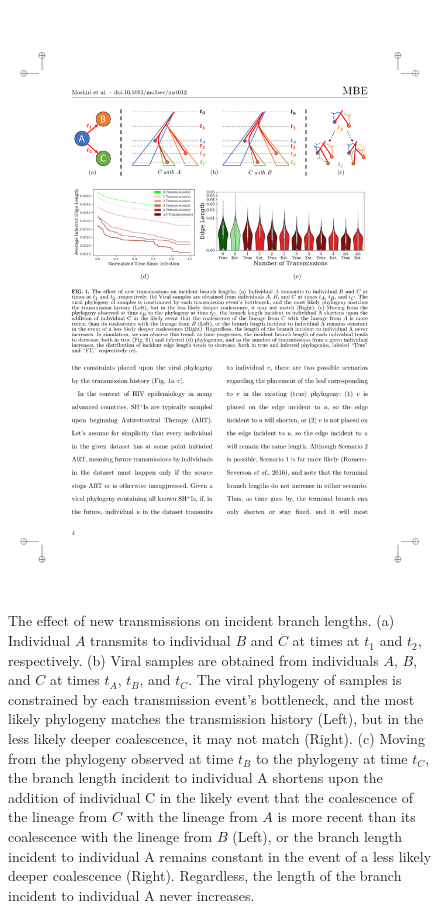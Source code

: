 \begin{figure} %
\centering
\includegraphics[width=\textwidth]{figs/proact-diagram}
\caption[ProACT Diagram]
{The effect of new transmissions on incident branch lengths. (a) Individual $A$ transmits to individual $B$ and $C$ at times at  $t_1$ and $t_2$, respectively. (b) Viral samples are obtained from individuals $A$, $B$, and $C$ at times $t_A$, $t_B$, and $t_C$. The viral phylogeny of samples is constrained by each transmission event's bottleneck, and the most likely phylogeny matches the transmission history (Left), but in the less likely deeper coalescence, it may not match (Right). (c) Moving from the phylogeny observed at time $t_B$ to the phylogeny at time $t_C$, the branch length incident to individual A  shortens upon the addition of individual C  in the likely event that the coalescence of the lineage from $C$ with the lineage from $A$ is more recent than its coalescence with the lineage from $B$ (Left), or the branch length incident to individual A remains constant in the event of a less likely deeper coalescence (Right). Regardless, the length of the branch incident to individual A never increases.
}
\end{figure}
